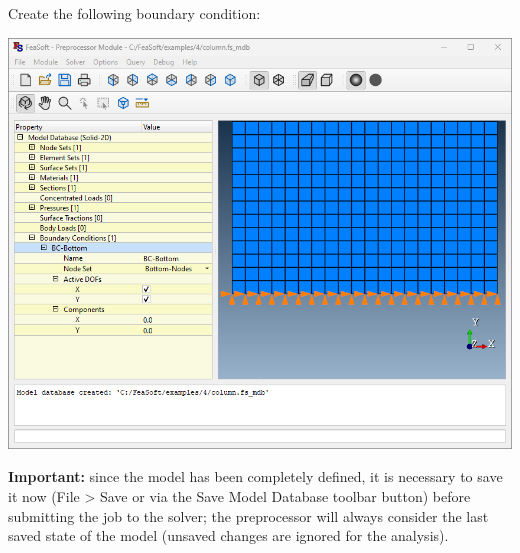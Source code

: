\documentclass[
    11pt,        %
    a4paper,     %
    final,       %
    fleqn,       %
    notitlepage, %
    onecolumn,   %
    oneside,     %
]{article}
\begin{document}
Create the following boundary condition:
\begin{center}
\end{center}
\begin{center}
    \includegraphics[scale=0.5]{fig/ui-4-9.png}
\end{center}

\textbf{Important:} since the model has been completely defined, it is necessary to save it now (File > Save or via the Save Model Database toolbar button) before submitting the job to the solver; the preprocessor will always consider the last saved state of the model (unsaved changes are ignored for the analysis).
\end{document}
